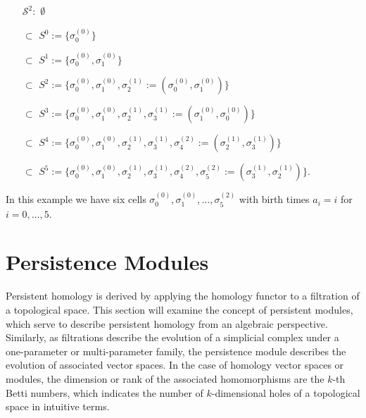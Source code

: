 \begin{example}{\cite[\S 2.2, Example]{de2011dualities}}
	\begin{itemize}
		\item[$\mathcal{S}^{2}:$] $\emptyset$
		\item[$\subset$] $S^{0} := \{\sigma_{0}^{(0)}\}$
		\item[$\subset$] $S^{1} := \{\sigma_{0}^{(0)}, \sigma_{1}^{(0)}\}$
		\item[$\subset$] $S^{2} := \{\sigma_{0}^{(0)}, \sigma_{1}^{(0)}, \sigma_{2}^{(1)} := (\sigma_{0}^{(0)}, \sigma_{1}^{(0)})\}$
		\item[$\subset$] $S^{3} := \{\sigma_{0}^{(0)}, \sigma_{1}^{(0)}, \sigma_{2}^{(1)}, \sigma_{3}^{(1)} := (\sigma_{1}^{(0)}, \sigma_{0}^{(0)})\}$
		\item[$\subset$] $S^{4} := \{\sigma_{0}^{(0)}, \sigma_{1}^{(0)}, \sigma_{2}^{(1)}, \sigma_{3}^{(1)}, \sigma_{4}^{(2)} := (\sigma_{2}^{(1)}, \sigma_{3}^{(1)})\}$
		\item[$\subset$] $S^{5} := \{\sigma_{0}^{(0)}, \sigma_{1}^{(0)}, \sigma_{2}^{(1)}, \sigma_{3}^{(1)}, \sigma_{4}^{(2)}, \sigma_{5}^{(2)} := (\sigma_{3}^{(1)}, \sigma_{2}^{(1)})\}.$
	\end{itemize}
	In this example we have six cells $\sigma_0^{(0)}, \sigma_1^{(0)}, \ldots, \sigma_5^{(2)}$ with birth times $a_i = i$ for $i = 0, \ldots, 5$.
\end{example}
\vspace{0.2cm}

\section{Persistence Modules}
\label{PersistenceModules}
Persistent homology is derived by applying the homology functor to a filtration of a topological space. This section will examine the concept of persistent modules, which serve to describe persistent homology from an algebraic perspective. Similarly, as filtrations describe the evolution of a simplicial complex under a one-parameter or multi-parameter family, the persistence module describes the evolution of associated vector spaces. In the case of homology vector spaces or modules, the dimension or rank of the associated homomorphisms are the $k$-th Betti numbers, which indicates the number of $k$-dimensional holes of a topological space in intuitive terms.

